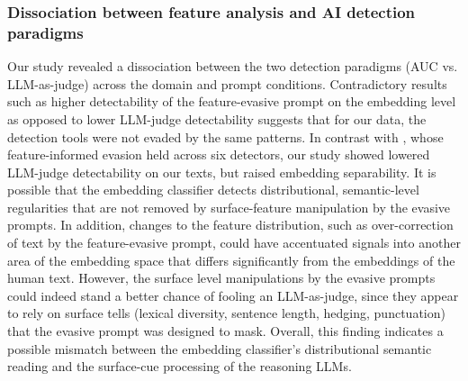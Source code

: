 \documentclass[thesis]{cluu}
\providecommand{\DIFadd}[1]{\texorpdfstring{\highLight[yellow]{#1}}{#1}} %
\providecommand{\DIFadd}[1]{#1} %
\providecommand{\DIFdel}[1]{} %
\providecommand{\DIFaddbegin}{} %
\providecommand{\DIFaddend}{} %
\providecommand{\DIFdelbegin}{} %
\providecommand{\DIFdelend}{} %
\begin{document}
\subsubsection{Dissociation between feature analysis and AI detection paradigms} Our study revealed a dissociation between the two detection paradigms (AUC vs. LLM-as-judge) across the domain and prompt conditions. Contradictory results such as higher detectability of the feature-evasive prompt on the embedding level as opposed to lower LLM-judge detectability suggests that for our data, the detection tools were not evaded by the same patterns. In contrast with \DIFdelbegin \DIFdel{\textcite{lu2024largelanguagemodelsguided}}\DIFdelend \DIFaddbegin \DIFadd{\textcite{lu2024sico}}\DIFaddend , whose feature-informed evasion held across six detectors, our study showed lowered LLM-judge detectability on our texts, but raised embedding separability. It is possible that the embedding classifier detects distributional, semantic-level regularities that are not removed by surface-feature manipulation by the evasive prompts. In addition, changes to the feature distribution, such as over-correction of text by the feature-evasive prompt, could have accentuated signals into another area of the embedding space that differs significantly from the embeddings of the human text. However, the surface level manipulations by the evasive prompts could indeed stand a better chance of fooling an LLM-as-judge, since they appear to rely on surface tells (lexical diversity, sentence length, hedging, punctuation) that the evasive prompt was designed to mask. Overall, this finding indicates a possible mismatch between the embedding classifier's distributional semantic reading and the surface-cue processing of the reasoning LLMs.
\end{document}
